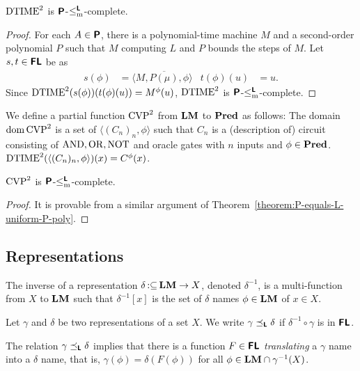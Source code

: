 \documentclass[envcountsame,orivec,oribibl]{llncs}
\newcommand{\pcolon}{\mathpunct{\,:\subseteq}}
\begin{document}
\begin{lemma}
 $\mathrm{DTIME}^2$ is $\text{\bfseries \sffamily \upshape P}$-$\leq _{\mathrm{m}} ^{\text{\bfseries \sffamily \upshape L}}$-complete.
\end{lemma}

\begin{proof}
 For each $A \in \text{\bfseries \sffamily \upshape P}$, there is a polynomial-time machine $M$ and a second-order polynomial $P$ such that $M$ computing $L$ and $P$ bounds the steps of $M$.
 Let $s, t \in \text{\bfseries \sffamily \upshape FL}$ be as
 \begin{align}
  s(\phi) &= \langle M, \overline{P(\mu)}, \phi \rangle
  &
  t(\phi)(u) &= u.
 \end{align}
 Since  $\mathrm{DTIME}^2(s(\phi))(t(\phi)(u)) = M^\phi (u)$,
 $\mathrm{DTIME}^2$ is $\text{\bfseries \sffamily \upshape P}$-$\leq _{\mathrm{m}} ^{\text{\bfseries \sffamily \upshape L}}$-complete.
\end{proof}


We define a partial function  $\mathrm{CVP}^2$ from $\mathbf{LM}$ to $\mathbf{Pred}$ as follows:
The domain $\mathop{\rm dom} \mathrm{CVP}^2$ is a set of $\langle (C_n)_n, \phi \rangle$
such that $C_n$ is a (description of) circuit consisting of $\mathrm{AND}, \mathrm{OR}, \mathrm{NOT}$
and oracle gates with $n$ inputs and $\phi \in \mathbf{Pred}$.
$\mathrm{DTIME}^2(\langle (C_n)_n,  \phi \rangle)(x) = C^\phi(x)$.

\begin{lemma}
 $\mathrm{CVP}^2$ is $\text{\bfseries \sffamily \upshape P}$-$\leq _{\mathrm{m}} ^{\text{\bfseries \sffamily \upshape L}}$-complete.
\end{lemma}

\begin{proof}
 It is provable from a similar argument of Theorem~\ref{theorem:P-equals-L-uniform-P-poly}.
\end{proof}



\subsection{Representations}
\newcommand{\transL}{\preceq_\classLtwo}


The inverse of a representation $\delta \pcolon \LM \to X$, 
denoted $\delta^{-1}$, is a multi-function from $X$ to $\mathbf{LM}$ such that 
$\delta^{-1}[x]$ is the set of $\delta$ names $\phi \in \mathbf{LM}$ of $x \in X$.


\begin{definition}
Let $\gamma$ and $\delta$ be two representations of a set $X$.
We write $\gamma \transL \delta$ if
$\delta^{-1} \circ \gamma$ is in $\text{\bfseries \sffamily \upshape FL}$.
\end{definition}
The relation $\gamma \transL \delta$ implies that
there is a function $F \in \text{\bfseries \sffamily \upshape FL}$ \emph{translating} a $\gamma$ name
into a $\delta$ name, that is, $\gamma(\phi) = \delta(F(\phi))$ 
for all $\phi \in \mathbf{LM} \cap \gamma^{-1}(X)$.
\end{document}
